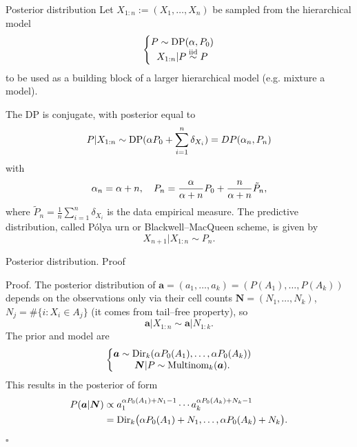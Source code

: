 \begin{frame}{Posterior distribution}
	Let $X_{1:n} := (X_1,\ldots, X_n)$ be sampled from the \alert{hierarchical model} 
\begin{equation*}
    \left \{ \begin{matrix}
P \sim \text{DP}(\alpha, P_0)\\ 
X_{1:n}|P \stackrel{\mbox{\scriptsize{iid}}}{\sim} P
\end{matrix}\right.
\end{equation*}
to be used as a building block of a larger hierarchical model (e.g. mixture a model).
\pause
 
\begin{theorem} 
The DP is \alert{conjugate}, with posterior equal to
\begin{equation*}
    P|X_{1:n}\sim \text{DP}(\alpha P_0 + \sum_{i=1}^n\delta_{X_i}) = DP(\alpha_n, P_n)
\end{equation*}
with $$\alpha_n = \alpha+n, \quad P_n = \frac{\alpha}{\alpha +n} P_0 + \frac{n}{\alpha + n}\tilde P_n,$$
 where $\tilde P_n = \frac{1}{n}\sum_{i=1}^n\delta_{X_i}$ is the data empirical measure. The \alert{predictive distribution}, called \alert{P\'olya urn} or \alert{Blackwell--MacQueen scheme}, is given by
\begin{equation*}
    X_{n+1} | X_{1:n} \sim P_n.
\end{equation*}
\end{theorem}
\end{frame}


\begin{frame}{Posterior distribution. Proof}

\alert{Proof.}
The posterior distribution of $\boldsymbol{a} = (a_1, \ldots, a_k) = ( P(A_1), \ldots, P(A_k) )$ depends on the observations only via their cell counts $\boldsymbol{N}= (N_1, \ldots, N_k)$, $N_j = \# \{ i : X_i \in A_j\}$  (it comes from \alert{tail--free} property), so
\begin{equation*}
  \boldsymbol{a} \vert X_{1:n}\sim \boldsymbol{a} \vert N_{1:k}.
\end{equation*}
The prior  and model are
\begin{equation*}
    \left \{ 
    \begin{matrix}
\boldsymbol{a} \sim \text{Dir}_k (\alpha P_0(A_1), \ldots, \alpha P_0(A_k))
\\
\boldsymbol{N}\vert P \sim {\rm Multinom}_k (\boldsymbol{a}).
\end{matrix}\right.
\end{equation*}
This results in the posterior of form 
\begin{align*}
    P(\boldsymbol{a}\vert \boldsymbol{N}) 
    &\propto a_1^{\alpha P_0(A_1) +N_1-1}\cdots a_k^{\alpha P_0(A_k)+N_k -1}\\ 
    &= \text{Dir}_k\big( \alpha P_0(A_1) +N_1, \ldots, \alpha P_0(A_k) +N_k\big).
\end{align*} \hfill $\square$
\end{frame}



